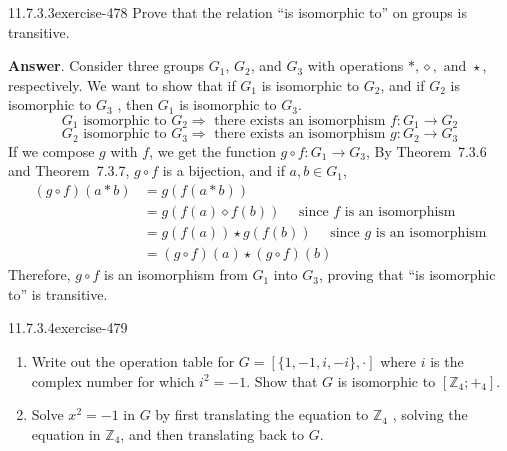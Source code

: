 \documentclass[twoside,10pt,]{book}
\numberwithin{equation}{section}
\begin{document}
\begin{divisionsolution}{11.7.3.3}{}{exercise-478}%
\hypertarget{p-4280}{}%
Prove that the relation ``is isomorphic to'' on groups is transitive.%
\par\smallskip%
\noindent\textbf{Answer}.\quad%
\hypertarget{p-4281}{}%
Consider three groups \(G_1\), \(G_2\), and \(G_3\) with operations \(*, \diamond , \textrm{ and } \star \), respectively. We want to show that if \(G_1\) is isomorphic to \(G_2\), and if \(G_2\) is isomorphic to \(G_3\) , then \(G_1\) is isomorphic to \(G_3\).%
\begin{equation*}
G_1 \textrm{ isomorphic} \textrm{ to } G_2\Rightarrow  \textrm{ there} \textrm{ exists} \textrm{ an} \textrm{ isomorphism } f:G_1\to G_2
\end{equation*}
%
\begin{equation*}
G_2 \textrm{ isomorphic} \textrm{ to } G_3\Rightarrow  \textrm{ there} \textrm{ exists} \textrm{ an} \textrm{ isomorphism } g:G_2\to G_3
\end{equation*}
If we compose \(g\) with \(f\), we get the function \(g\circ f:G_1\to G_3\),  By Theorem~7.3.6 and Theorem~7.3.7, \(g\circ f\) is a bijection, and if \(a,b\in G_1\),%
\begin{equation*}
\begin{split}
(g\circ f)(a*b) &=g(f(a*b))\\
&=g(f(a)\diamond f(b))\quad  \textrm{ since } f \textrm{ is an isomorphism}\\
& =g(f(a))\star g(f(b))\quad \textrm{ since } g \textrm{ is an isomorphism}\\
& =(g\circ f)(a) \star (g\circ f)(b)
\end{split}
\end{equation*}
Therefore, \(g\circ f\) is an isomorphism from \(G_1\) into \(G_3\), proving that ``is isomorphic to'' is transitive.%
\end{divisionsolution}%
\begin{divisionsolution}{11.7.3.4}{}{exercise-479}%
\hypertarget{p-4282}{}%
\leavevmode%
\begin{enumerate}[label=(\alph*)]
\item\hypertarget{li-1962}{}\hypertarget{p-4283}{}%
Write out the operation table for \(G = [\{1, -1, i, -i \}, \cdot ]\) where \(i\) is the complex number for which \(i^2 = - 1\). Show that \(G\) is isomorphic to \(\left[\mathbb{Z}_4;+_4\right]\).%
\item\hypertarget{li-1963}{}\hypertarget{p-4284}{}%
Solve \(x^2= -1\) in \(G\) by first translating the equation to \(\mathbb{Z}_4\) , solving the equation in \(\mathbb{Z}_4\), and then translating back to \(G\).%
\end{enumerate}
%
\end{divisionsolution}%
\end{document}
